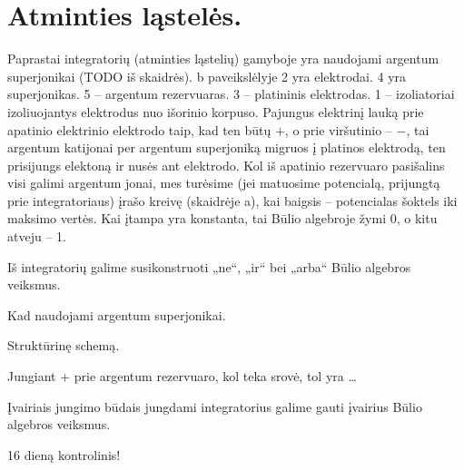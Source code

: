 \section{Atminties ląstelės.}

Paprastai integratorių (atminties ląstelių) gamyboje yra naudojami 
argentum superjonikai (TODO iš skaidrės). b paveikslėlyje 2 yra
elektrodai. 4 yra superjonikas. 5 – argentum rezervuaras. 3 – platininis
elektrodas. 1 – izoliatoriai izoliuojantys elektrodus nuo išorinio
korpuso. Pajungus elektrinį lauką prie apatinio elektrinio elektrodo
taip, kad ten būtų $+$, o prie viršutinio – $-$, tai argentum katijonai
per argentum superjoniką migruos į platinos elektrodą, ten prisijungs
elektoną ir nusės ant elektrodo. Kol iš apatinio rezervuaro pasišalins
visi galimi argentum jonai, mes turėsime (jei matuosime potencialą,
prijungtą prie integratoriaus) įrašo kreivę (skaidrėje a), kai
baigsis – potencialas šoktels iki maksimo vertės. Kai įtampa
yra konstanta, tai Būlio algebroje žymi 0, o kitu atveju – 1.

Iš integratorių galime susikonstruoti „ne“, „ir“ bei
„arba“ Būlio algebros veiksmus.

\begin{remember}
  \item Kad naudojami argentum superjonikai.
  \item Struktūrinę schemą.
  \item Jungiant $+$ prie argentum rezervuaro, kol teka srovė, tol yra
    …
  \item Įvairiais jungimo būdais jungdami integratorius galime gauti
    įvairius Būlio algebros veiksmus.
\end{remember}

16 dieną kontrolinis!
